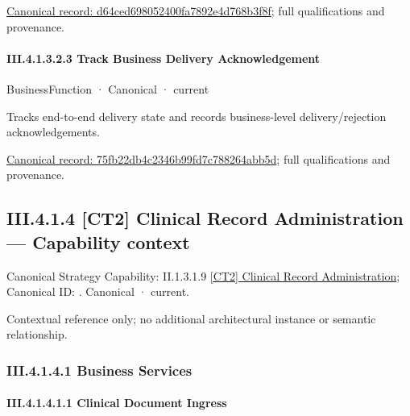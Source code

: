 {\footnotesize \href{../../../../continuum/business/business-function/d64ced698052400fa7892e4d768b3f8f.md}{Canonical record: d64ced698052400fa7892e4d768b3f8f}; full qualifications and provenance.}\par
\paragraph*{III.4.1.3.2.3 Track Business Delivery Acknowledgement}
\label{navigation:III.4.1.3.2.3}

\label{element:75fb22db4c2346b99fd7c788264abb5d}
{\small BusinessFunction · Canonical · current}\par

Tracks end-to-end delivery state and records business-level delivery/rejection acknowledgements.


{\footnotesize \href{../../../../continuum/business/business-function/75fb22db4c2346b99fd7c788264abb5d.md}{Canonical record: 75fb22db4c2346b99fd7c788264abb5d}; full qualifications and provenance.}\par
\subsection*{III.4.1.4 [CT2] Clinical Record Administration — Capability context}
\label{navigation:III.4.1.4}

{\small Canonical Strategy Capability: II.1.3.1.9 \hyperref[element:ce9e7e7b22054cefb707a650d5be7219]{[CT2] Clinical Record Administration}; Canonical ID: \texttt{}. Canonical · current.}\par
Contextual reference only; no additional architectural instance or semantic relationship.\par
\subsubsection*{III.4.1.4.1 Business Services}
\label{navigation:III.4.1.4.1}

\paragraph*{III.4.1.4.1.1 Clinical Document Ingress}
\label{navigation:III.4.1.4.1.1}

